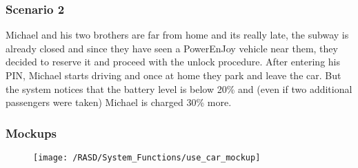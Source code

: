 \subsubsection{Scenario 2}
Michael and his two brothers are far from home and its really late, the subway is already closed and since they have seen a PowerEnJoy vehicle near them, they decided to reserve it and proceed with the unlock procedure. After entering his PIN, Michael starts driving and once at home they park and leave the car. But the system notices that the battery level is below 20\% and (even if two additional passengers were taken) Michael is charged 30\% more.


\subsubsection{Mockups}
\begin{figure}[!ht]
  \centering
  \vspace{0.2cm}
  \texttt{[image: /RASD/System\_Functions/use\_car\_mockup]}\\
  \vspace{0.4cm}
  \label{fig:use_car_mockup} 
\end{figure}


